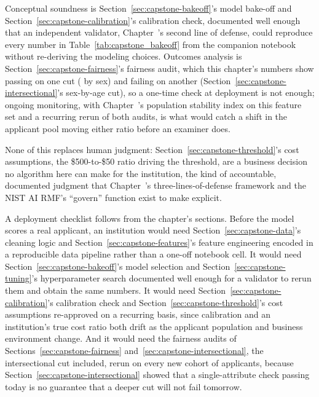\documentclass[../ai_in_finance]{subfiles}
\begin{document}
Conceptual soundness is Section~\ref{sec:capstone-bakeoff}'s model bake-off and Section~\ref{sec:capstone-calibration}'s calibration check, documented well enough that an independent validator, Chapter~'s second line of defense, could reproduce every number in Table~\ref{tab:capstone_bakeoff} from the companion notebook without re-deriving the modeling choices. Outcomes analysis is Section~\ref{sec:capstone-fairness}'s fairness audit, which this chapter's numbers show passing on one cut (\vChTwentyOneFairAIR{} by sex) and failing on another (Section~\ref{sec:capstone-intersectional}'s sex-by-age cut), so a one-time check at deployment is not enough; ongoing monitoring, with Chapter~'s population stability index on this feature set and a recurring rerun of both audits, is what would catch a shift in the applicant pool moving either ratio before an examiner does.

None of this replaces human judgment: Section~\ref{sec:capstone-threshold}'s cost assumptions, the \$500-to-\$50 ratio driving the threshold, are a business decision no algorithm here can make for the institution, the kind of accountable, documented judgment that Chapter~'s three-lines-of-defense framework and the NIST AI RMF's ``govern'' function exist to make explicit.

A deployment checklist follows from the chapter's sections. Before the model scores a real applicant, an institution would need Section~\ref{sec:capstone-data}'s cleaning logic and Section~\ref{sec:capstone-features}'s feature engineering encoded in a reproducible data pipeline rather than a one-off notebook cell. It would need Section~\ref{sec:capstone-bakeoff}'s model selection and Section~\ref{sec:capstone-tuning}'s hyperparameter search documented well enough for a validator to rerun them and obtain the same numbers. It would need Section~\ref{sec:capstone-calibration}'s calibration check and Section~\ref{sec:capstone-threshold}'s cost assumptions re-approved on a recurring basis, since calibration and an institution's true cost ratio both drift as the applicant population and business environment change. And it would need the fairness audits of Sections~\ref{sec:capstone-fairness} and~\ref{sec:capstone-intersectional}, the intersectional cut included, rerun on every new cohort of applicants, because Section~\ref{sec:capstone-intersectional} showed that a single-attribute check passing today is no guarantee that a deeper cut will not fail tomorrow.
\end{document}
